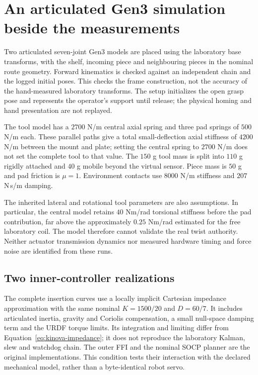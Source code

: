\section{An articulated Gen3 simulation beside the measurements}
\label{sec:kinova-sim-comparison}

Two articulated seven-joint Gen3 models are placed using the laboratory base transforms, with the shelf, incoming piece and neighbouring pieces in the nominal route geometry. Forward kinematics is checked against an independent chain and the logged initial poses. This checks the frame construction, not the accuracy of the hand-measured laboratory transforms. The setup initializes the open grasp pose and represents the operator's support until release; the physical homing and hand presentation are not replayed.

The tool model has a $2700$ N/m central axial spring and three pad springs of $500$ N/m each. These parallel paths give a total small-deflection axial stiffness of $4200$ N/m between the mount and plate; setting the central spring to $2700$ N/m does not set the complete tool to that value. The $150$ g tool mass is split into $110$ g rigidly attached and $40$ g mobile beyond the virtual sensor. Piece mass is $50$ g and pad friction is $\mu=1$. Environment contacts use $8000$ N/m stiffness and $207$ N\,s/m damping.

The inherited lateral and rotational tool parameters are also assumptions. In particular, the central model retains $40$ Nm/rad torsional stiffness before the pad contribution, far above the approximately $0.25$ Nm/rad estimated for the free laboratory coil. The model therefore cannot validate the real twist authority. Neither actuator transmission dynamics nor measured hardware timing and force noise are identified from these runs.

\subsection{Two inner-controller realizations}

The complete insertion curves use a locally implicit Cartesian impedance approximation with the same nominal $K=1500/20$ and $D=60/7$. It includes articulated inertia, gravity and Coriolis compensation, a small null-space damping term and the URDF torque limits. Its integration and limiting differ from Equation~\eqref{eq:kinova-impedance}; it does not reproduce the laboratory Kalman, slew and watchdog chain. The outer FFI and the nominal SOCP planner are the original implementations. This condition tests their interaction with the declared mechanical model, rather than a byte-identical robot servo.

